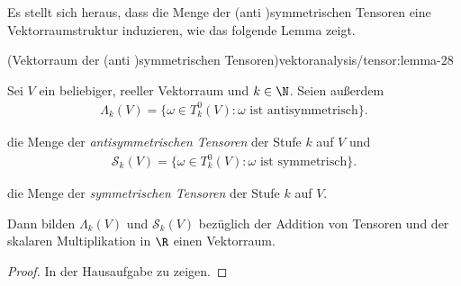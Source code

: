 \documentclass[letterpaper,10pt,english]{jupyterBook}
\begin{document}
\par
Es stellt sich heraus, dass die Menge der (anti )symmetrischen Tensoren eine Vektorraumstruktur induzieren, wie das folgende Lemma zeigt.
\begin{lemma}{(Vektorraum der (anti )symmetrischen Tensoren)}{vektoranalysis/tensor:lemma-28}



\par
Sei \(V\) ein beliebiger, reeller Vektorraum und \(k \in \N\).
Seien außerdem
\begin{align*}
\Lambda_k(V) = \lbrace \omega \in T_k^0(V) : \omega \text{ ist antisymmetrisch} \rbrace.
\end{align*}
\par
die Menge der \emph{antisymmetrischen Tensoren} der Stufe \(k\) auf \(V\) und
\begin{align*}
\mathcal{S}_k(V) = \lbrace \omega \in T_k^0(V) : \omega \text{ ist symmetrisch} \rbrace.
\end{align*}
\par
die Menge der \emph{symmetrischen Tensoren} der Stufe \(k\) auf \(V\).

\par
Dann bilden \(\Lambda_k(V)\) und \(\mathcal{S}_k(V)\) bezüglich der Addition von Tensoren und der skalaren Multiplikation in \(\R\) einen Vektorraum.
\end{lemma}

\begin{proof}
 In der Hausaufgabe zu zeigen.
\end{proof}
\end{document}
